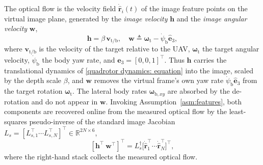 \documentclass{IEEEtaes}
\theoremstyle{definition}
\theoremstyle{remark}
\begin{document}
The optical flow is the velocity field $\dot{\hat{\boldsymbol{r}}}_i(t)$ of the image feature points on the virtual image plane, generated by the \emph{image velocity} $\boldsymbol{h}$ and the \emph{image angular velocity} $\boldsymbol{w}$,
\begin{equation} \label{optic flow def: equation}
    \boldsymbol{h} = \beta\,\boldsymbol{v}_{\text{t/b}}, \quad \boldsymbol{w} \triangleq \boldsymbol{\omega}_\text{t}-\dot{\psi}_\text{b}\hat{\boldsymbol{e}}_3,
\end{equation}
where $\boldsymbol{v}_{\text{t/b}}$ is the velocity of the target relative to the UAV, $\boldsymbol{\omega}_\text{t}$ the target angular velocity, $\dot{\psi}_\text{b}$ the body yaw rate, and $\hat{\boldsymbol{e}}_3=[0,0,1]^\top$. Thus $\boldsymbol{h}$ carries the translational dynamics of \eqref{quadrotor dynamics: equation} into the image, scaled by the depth scale $\beta$, and $\boldsymbol{w}$ removes the virtual frame's own yaw rate $\dot{\psi}_\text{b}\hat{\boldsymbol{e}}_3$ from the target rotation $\boldsymbol{\omega}_\text{t}$. The lateral body rates $\boldsymbol{\omega}_{\text{b},xy}$ are absorbed by the de-rotation and do not appear in $\boldsymbol{w}$. Invoking Assumption~\ref{asm:features}, both components are recovered online from the measured optical flow by the least-squares pseudo-inverse of the standard image Jacobian $L_s=[L_{s,1}^\top \cdots L_{s,N}^\top]^\top\in\mathbb{R}^{2N\times 6}$,
\begin{equation} \label{optic flow inverse: equation}
    [\boldsymbol{h}^\top~\boldsymbol{w}^\top]^\top = L_s^\dagger\big[\dot{\hat{\boldsymbol{r}}}_1^\top \cdots \dot{\hat{\boldsymbol{r}}}_N^\top\big]^\top,
\end{equation}
where the right-hand stack collects the measured optical flow.
\end{document}
